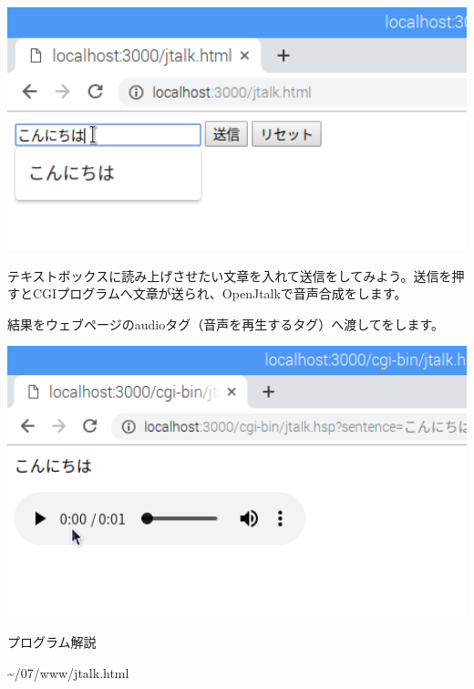 \documentclass[a4paper,12pt,dvipdfmx]{jarticle}
\begin{document}
\centering
\includegraphics[width=14.319cm]{ome7-img056.png}
\flushleft

テキストボックスに読み上げさせたい文章を入れて送信をしてみよう。送信を押すとCGIプログラムへ文章が送られ、OpenJtalkで音声合成をします。


\bigskip

結果をウェブページのaudioタグ（音声を再生するタグ）へ渡してをします。

%
%


\centering
\includegraphics[width=14.392cm]{ome7-img057.png}
\flushleft

\clearpage
プログラム解説

{\textasciitilde}/07/www/jtalk.html
\end{document}
